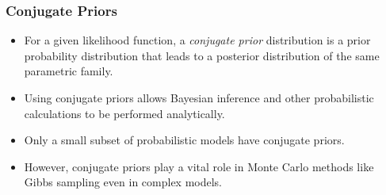 \documentclass{slides}
\begin{document}
\begin{frame}
	\frametitle{Conjugate Priors}
	\begin{itemize}
		\item For a given likelihood function, a \emph{conjugate prior} distribution is a prior probability distribution that leads to a posterior distribution of the same parametric family.
		\item Using conjugate priors allows Bayesian inference and other probabilistic calculations to be performed analytically.
		\item Only a small subset of probabilistic models have conjugate priors.
		\item However, conjugate priors play a vital role in Monte Carlo methods like Gibbs sampling even in complex models.
	\end{itemize}
\end{frame}
\end{document}
